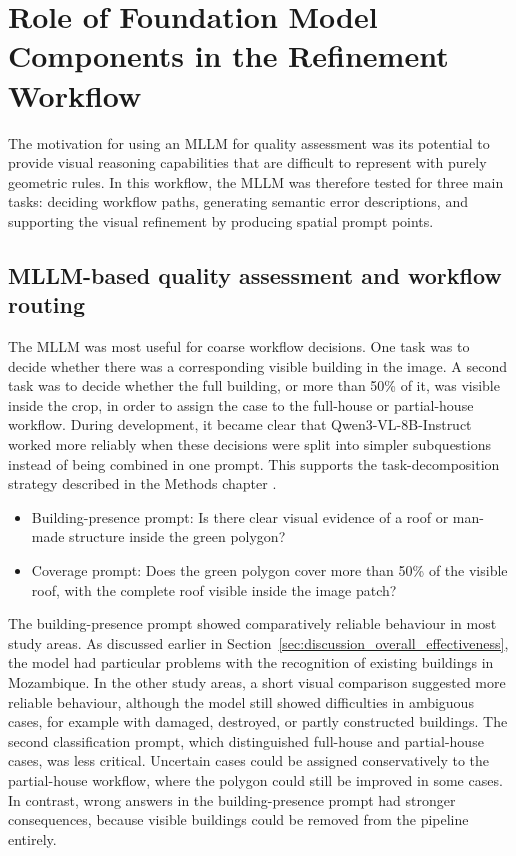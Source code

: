 \section{Role of Foundation Model Components in the Refinement Workflow}

The motivation for using an MLLM for quality assessment was its potential to provide visual reasoning capabilities that are difficult to represent with purely geometric rules. In this workflow, the MLLM was therefore tested for three main tasks: deciding workflow paths, generating semantic error descriptions, and supporting the visual refinement by producing spatial prompt points.

\subsection{MLLM-based quality assessment and workflow routing}

The MLLM was most useful for coarse workflow decisions. One task was to decide whether there was a corresponding visible building in the image. A second task was to decide whether the full building, or more than 50\% of it, was visible inside the crop, in order to assign the case to the full-house or partial-house workflow. During development, it became clear that Qwen3-VL-8B-Instruct worked more reliably when these decisions were split into simpler subquestions instead of being combined in one prompt. This supports the task-decomposition strategy described in the Methods chapter \citep{zhou2022least, Zaid_prompt_decompisiton}.

\begin{itemize}
    \item Building-presence prompt: Is there clear visual evidence of a roof or man-made structure inside the green polygon?
    \item Coverage prompt: Does the green polygon cover more than 50\% of the visible roof, with the complete roof visible inside the image patch?
\end{itemize}

The building-presence prompt showed comparatively reliable behaviour in most study areas. As discussed earlier in Section~\ref{sec:discussion_overall_effectiveness}, the model had particular problems with the recognition of existing buildings in Mozambique. In the other study areas, a short visual comparison suggested more reliable behaviour, although the model still showed difficulties in ambiguous cases, for example with damaged, destroyed, or partly constructed buildings. The second classification prompt, which distinguished full-house and partial-house cases, was less critical. Uncertain cases could be assigned conservatively to the partial-house workflow, where the polygon could still be improved in some cases. In contrast, wrong answers in the building-presence prompt had stronger consequences, because visible buildings could be removed from the pipeline entirely.

